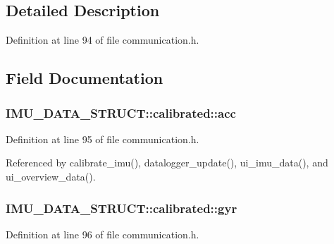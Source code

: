 \subsection{Detailed Description}


Definition at line 94 of file communication.\-h.



\subsection{Field Documentation}
\hypertarget{structIMU__DATA__STRUCT_1_1calibrated_a281a7fdb40a05ed97388f18b9bb90c81}{
\subsubsection[{acc}]{ I\-M\-U\-\_\-\-D\-A\-T\-A\-\_\-\-S\-T\-R\-U\-C\-T\-::calibrated\-::acc}}\label{structIMU__DATA__STRUCT_1_1calibrated_a281a7fdb40a05ed97388f18b9bb90c81}


Definition at line 95 of file communication.\-h.



Referenced by calibrate\-\_\-imu(), datalogger\-\_\-update(), ui\-\_\-imu\-\_\-data(), and ui\-\_\-overview\-\_\-data().

\hypertarget{structIMU__DATA__STRUCT_1_1calibrated_a8a54aded6ce608f1b7d2b4a0c52c248b}{
\subsubsection[{gyr}]{ I\-M\-U\-\_\-\-D\-A\-T\-A\-\_\-\-S\-T\-R\-U\-C\-T\-::calibrated\-::gyr}}\label{structIMU__DATA__STRUCT_1_1calibrated_a8a54aded6ce608f1b7d2b4a0c52c248b}


Definition at line 96 of file communication.\-h.



